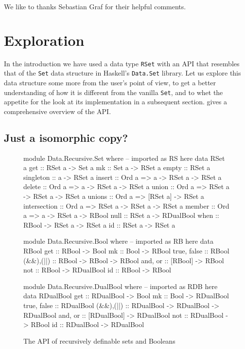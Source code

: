 \documentclass[manuscript,anonymous,screen,acmsmall]{acmart}
\begin{document}
\begin{acks}
We like to thanks Sebastian Graf for their helpful comments.
\end{acks}

\section{Exploration}\label{sec:exploration}

In the introduction we have used a data type \verb|RSet| with an API that resembles that of the \verb|Set| data structure in Haskell's \verb|Data.Set| library. Let us explore this data structure some more from the user's point of view, to get a better understanding of how it is different from the vanilla \verb|Set|, and to whet the appetite for the look at its implementation in a subsequent section.
 gives a comprehensive overview of the API.

\subsection{Just a isomorphic copy?}

\begin{figure}
\begin{code}
module Data.Recursive.Set where  -- imported as RS here
  data RSet a
  get           ::           RSet a ->            Set a
  mk            ::           Set a ->             RSet a
  empty         ::                                RSet a
  singleton     ::           a ->                 RSet a
  insert        :: Ord a =>  a -> RSet a ->       RSet a
  delete        :: Ord a =>  a -> RSet a ->       RSet a
  union         :: Ord a =>  RSet a -> RSet a ->  RSet a
  unions        :: Ord a =>  [RSet a] ->          RSet a
  intersection  :: Ord a =>  RSet a -> RSet a ->  RSet a
  member        :: Ord a =>  a -> RSet a ->       RBool
  null          ::           RSet a ->            RDualBool
  when          ::           RBool -> RSet a ->   RSet a
  id            ::           RSet a ->            RSet a

module Data.Recursive.Bool where  -- imported as RB here
  data RBool
  get          :: RBool ->           Bool
  mk           :: Bool ->            RBool
  true, false  ::                    RBool
  (&&),(||)    :: RBool -> RBool ->  RBool
  and, or      :: [RBool] ->         RBool
  not          :: RBool ->           RDualBool
  id           :: RBool ->           RBool

module Data.Recursive.DualBool where  -- imported as RDB here
  data RDualBool
  get          ::  RDualBool ->               Bool
  mk           ::  Bool ->                    RDualBool
  true, false  ::                             RDualBool
  (&&),(||)    ::  RDualBool -> RDualBool ->  RDualBool
  and, or      ::  [RDualBool] ->             RDualBool
  not          ::  RDualBool ->               RBool
  id           ::  RDualBool ->               RDualBool
\end{code}
\caption{The API of recursively definable sets and Booleans}\label{fig:api}
\end{figure}
\end{document}
